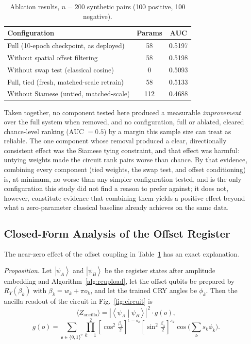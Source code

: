 \documentclass[conference]{IEEEtran}
\newcommand{\ket}[1]{\left|#1\right\rangle}
\newcommand{\braket}[2]{\left\langle#1\middle|#2\right\rangle}
\begin{document}
\begin{table}[t]
\centering
\caption{Ablation results, $n = 200$ synthetic pairs (100 positive, 100 negative).}
\label{tab:ablation}
\begin{tabular}{lcc}
\toprule
\textbf{Configuration} & \textbf{Params} & \textbf{AUC}\\
\midrule
Full (10-epoch checkpoint, as deployed) & 58 & 0.5197\\
Without spatial offset filtering & 58 & 0.5198\\
Without swap test (classical cosine) & 0 & 0.5093\\
Full, tied (fresh, matched-scale retrain) & 58 & 0.5133\\
Without Siamese (untied, matched-scale) & 112 & 0.4688\\
\bottomrule
\end{tabular}
\end{table}

Taken together, no component tested here produced a measurable \emph{improvement} over the full system when removed, and no configuration, full or ablated, cleared chance-level ranking (AUC $= 0.5$) by a margin this sample size can treat as reliable. The one component whose removal produced a clear, directionally consistent effect was the Siamese tying constraint, and that effect was harmful: untying weights made the circuit rank pairs worse than chance. By that evidence, combining every component (tied weights, the swap test, and offset conditioning) is, at minimum, no worse than any simpler configuration tested, and is the only configuration this study did not find a reason to prefer against; it does not, however, constitute evidence that combining them yields a positive effect beyond what a zero-parameter classical baseline already achieves on the same data.

\subsection{Closed-Form Analysis of the Offset Register}\label{sec:factor}
The near-zero effect of the offset coupling in Table~\ref{tab:ablation} has an exact explanation.

\emph{Proposition.} Let $\ket{\psi_A}$ and $\ket{\psi_B}$ be the register states after amplitude embedding and Algorithm~\ref{alg:reupload}, let the offset qubits be prepared by $R_Y(\beta_k)$ with $\beta_k = w_k + \pi o_k$, and let the trained CRY angles be $\phi_k$. Then the ancilla readout of the circuit in Fig.~\ref{fig:circuit} is
\begin{equation}
\langle Z_{\text{ancilla}}\rangle = \left|\braket{\psi_A}{\psi_B}\right|^2 \cdot g(o),
\label{eq:factor}
\end{equation}
\begin{equation}
g(o) = \sum_{\mathbf{s}\in\{0,1\}^2} \prod_{k=1}^{2}\left[\cos^2\tfrac{\beta_k}{2}\right]^{1-s_k}\!\left[\sin^2\tfrac{\beta_k}{2}\right]^{s_k} \cos\!\Big(\sum_k s_k\phi_k\Big).
\label{eq:gain}
\end{equation}
\end{document}
